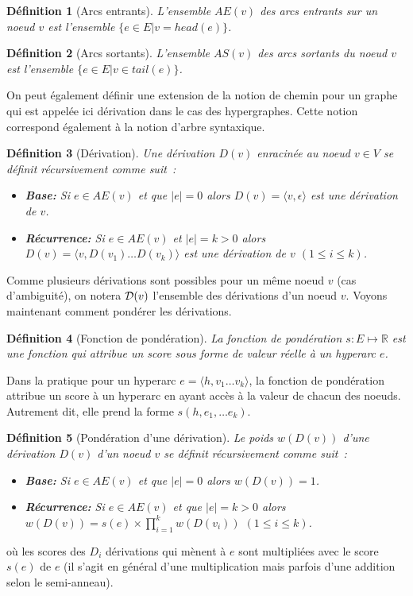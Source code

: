\documentclass[11pt,openany]{book}
\newtheorem{definition}{Définition}[chapter]
\begin{document}
\begin{definition}[Arcs entrants]
L'ensemble $AE(v)$ des arcs entrants sur un noeud $v$ est l'ensemble $\{e \in E | v =  head(e) \}$.
\end{definition}

\begin{definition}[Arcs sortants]
L'ensemble $AS(v)$ des arcs sortants du noeud $v$ est l'ensemble $\{e \in E | v \in tail(e) \}$.
\end{definition}

On peut également définir une extension de la notion de chemin pour un graphe 
qui est appelée ici dérivation dans le cas des hypergraphes. Cette notion correspond également à la notion d'arbre syntaxique.

\begin{definition}[Dérivation]
Une dérivation $D(v)$ enracinée au noeud $v \in V$ se définit récursivement comme suit~: 
\begin{itemize}
\item {\bf Base:} Si $e \in AE(v)$ et que $|e| = 0$ alors $D(v) = \langle v,\epsilon\rangle$ est une dérivation de $v$.
\item {\bf Récurrence:} Si $e \in AE(v)$ et $|e| = k > 0$ alors $D(v) =
  \langle v, D(v_1)\ldots D(v_k) \rangle$ est une dérivation de $v$
  $(1\leq i \leq k)$.
\end{itemize}
\end{definition}
Comme plusieurs dérivations sont possibles pour un même noeud $v$ (cas d'ambiguité),
on notera ${\cal D}(v)$ l'ensemble des dérivations d'un noeud $v$. Voyons maintenant comment pondérer les dérivations.

\begin{definition}[Fonction de pondération]
La fonction de pondération $s:E\mapsto \mathbb{R}$ est une fonction qui attribue un score sous forme de valeur réelle
à un hyperarc $e$. 
\end{definition}
Dans la pratique pour un hyperarc $e=\langle h, v_1\ldots v_k \rangle$, la fonction de pondération attribue un score
à un hyperarc en ayant accès à la valeur de chacun des noeuds. Autrement dit, elle prend la forme $s(h,e_1,\ldots e_k)$.

\begin{definition}[Pondération d'une dérivation]
Le poids $w(D(v))$ d'une dérivation $D(v)$ d'un noeud $v$ se définit récursivement comme suit~: 
\begin{itemize}
\item {\bf Base:} Si $e \in AE(v)$ et que $|e| = 0$ alors $w(D(v))  = 1$. 
\item {\bf Récurrence:} Si $e \in AE(v)$ et que $|e| = k > 0$ alors
  $w(D(v)) =  s(e) \times \prod_{i=1}^k w(D(v_i))$ $(1\leq i \leq k)$.
\end{itemize}
\end{definition}
où les scores des $D_i$ dérivations qui mènent à $e$ sont multipliées avec le score $s(e)$ de $e$
(il s'agit en général d'une multiplication mais parfois d'une addition selon le semi-anneau).
\end{document}
